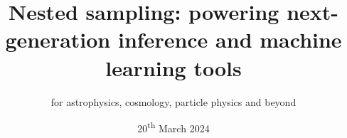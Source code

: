 \documentclass[aspectratio=169]{beamer}
\title{ Nested sampling: {\large powering next-generation inference and machine learning tools}}
\subtitle{for astrophysics, cosmology, particle physics and beyond}
\date{20\textsuperscript{th} March 2024}
\begin{document}
\begin{frame}
    \titlepage
\end{frame}

%
\end{document}
